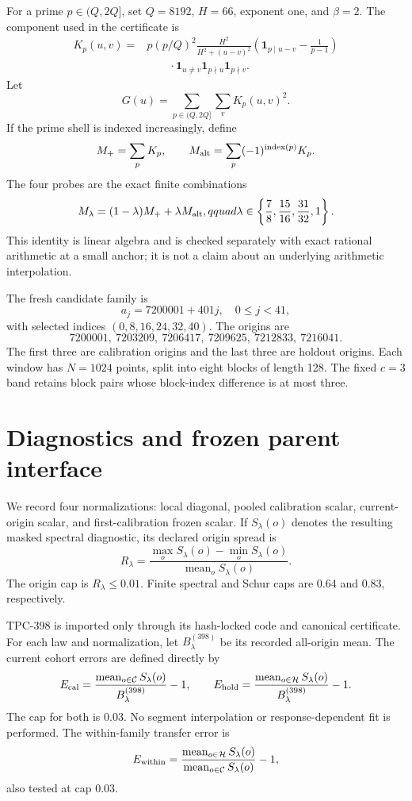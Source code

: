 \documentclass[10pt]{article}
\begin{document}
For a prime $p\in(Q,2Q]$, set $Q=8192$, $H=66$, exponent one, and $\beta=2$.
The component used in the certificate is
\begin{align*}
 K_p(u,v)={}&p(p/Q)^2\frac{H^2}{H^2+(u-v)^2}
 \left(\mathbf 1_{p\mid u-v}-\frac{1}{p-1}\right)\\
 &\qquad\cdot\mathbf 1_{u\ne v}\mathbf 1_{p\nmid u}\mathbf 1_{p\nmid v}.
\end{align*}
Let
\[
 G(u)=\sum_{p\in(Q,2Q]}\sum_v K_p(u,v)^2.
\]
If the prime shell is indexed increasingly, define
\[
 M_+=\sum_p K_p,\qquad
 M_{\rm alt}=\sum_p(-1)^{\operatorname{index}(p)}K_p.
\]
The four probes are the exact finite combinations
\[
 M_\lambda=(1-\lambda)M_+ + \lambda M_{\rm alt},qquad
 \lambda\in\left\{\frac78,\frac{15}{16},\frac{31}{32},1\right\}.
\]
This identity is linear algebra and is checked separately with exact rational
arithmetic at a small anchor; it is not a claim about an underlying
arithmetic interpolation.

The fresh candidate family is
\[
 a_j=7200001+401j,\quad 0\leq j<41,
\]
with selected indices $(0,8,16,24,32,40)$.  The origins are
\[
 7200001,\ 7203209,\ 7206417,\ 7209625,\ 7212833,\ 7216041.
\]
The first three are calibration origins and the last three are holdout
origins.  Each window has $N=1024$ points, split into eight blocks of length
128.  The fixed $c=3$ band retains block pairs whose block-index difference is
at most three.

\section{Diagnostics and frozen parent interface}

We record four normalizations: local diagonal, pooled calibration scalar,
current-origin scalar, and first-calibration frozen scalar.  If
$S_\lambda(o)$ denotes the resulting masked spectral diagnostic, its declared
origin spread is
\[
 R_\lambda=\frac{\max_o S_\lambda(o)-\min_o S_\lambda(o)}
 {\operatorname{mean}_o S_\lambda(o)}.
\]
The origin cap is $R_\lambda\leq0.01$.  Finite spectral and Schur caps are
0.64 and 0.83, respectively.

TPC-398 is imported only through its hash-locked code and canonical
certificate.  For each law and normalization, let
$B^{(398)}_\lambda$ be its recorded all-origin mean.  The current cohort
errors are defined directly by
\[
 E_{\rm cal}=\frac{\operatorname{mean}_{o\in\mathcal C}S_\lambda(o)}
 {B^{(398)}_\lambda}-1,\qquad
 E_{\rm hold}=\frac{\operatorname{mean}_{o\in\mathcal H}S_\lambda(o)}
 {B^{(398)}_\lambda}-1.
\]
The cap for both is 0.03.  No segment interpolation or response-dependent fit
is performed.  The within-family transfer error is
\[
 E_{\rm within}=\frac{\operatorname{mean}_{o\in\mathcal H}S_\lambda(o)}
 {\operatorname{mean}_{o\in\mathcal C}S_\lambda(o)}-1,
\]
also tested at cap 0.03.
\end{document}
